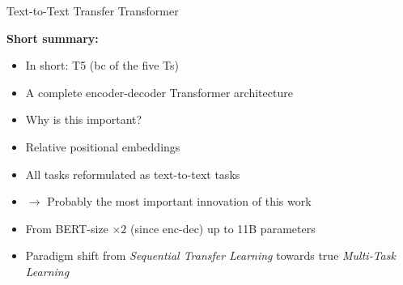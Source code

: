 \documentclass[11pt,compress,t,notes=noshow, xcolor=table]{beamer}
\begin{document}
\begin{frame}{Text-to-Text Transfer Transformer}

\vfill

	\textbf{Short summary:}

	\begin{itemize}
		\item In short: T5 (bc of the five Ts)
		\item A complete encoder-decoder Transformer architecture
		\item[] \ques Why is this important?
		\item Relative positional embeddings
		\item All tasks reformulated as text-to-text tasks
		\item[] $\to$ Probably the most important innovation of this work
		\item From BERT-size $\times2$ (since enc-dec) up to 11B parameters
		\item Paradigm shift from \textit{Sequential Transfer Learning} towards true \textit{Multi-Task Learning}
	\end{itemize}
	
	\vspace{.5cm}

	\begin{center}
		\href{https://1.bp.blogspot.com/-o4oiOExxq1s/Xk26XPC3haI/AAAAAAAAFU8/NBlvOWB84L0PTYy9TzZBaLf6fwPGJTR0QCLcBGAsYHQ/s1600/image3.gif}{\textbf{}}
	\end{center}
	
\vfill

\end{frame}

\end{document}
